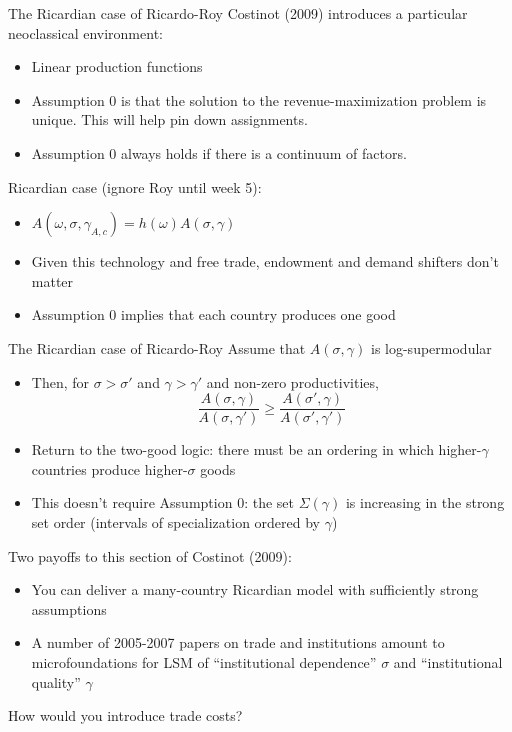 \documentclass[10pt,notes=hide]{beamer}
\begin{document}
\begin{frame}{The Ricardian case of Ricardo-Roy}
Costinot (2009) introduces a particular neoclassical environment:
\begin{itemize}
	\item Linear production functions
	\item Assumption 0 is that the solution to the revenue-maximization problem is unique.
		This will help pin down assignments.
	\item Assumption 0 always holds if there is a continuum of factors.
\end{itemize}
Ricardian case (ignore Roy until week 5):
\begin{itemize}
	\item $A(\omega,\sigma,\gamma_{A,c}) = h(\omega)A(\sigma,\gamma)$
	\item Given this technology and free trade, endowment and demand shifters don't matter
	\item Assumption 0 implies that each country produces one good
\end{itemize}
\end{frame}
\begin{frame}{The Ricardian case of Ricardo-Roy}
Assume that $A(\sigma,\gamma)$ is log-supermodular
\begin{itemize}
	\item Then, for $\sigma > \sigma'$ and $\gamma > \gamma'$ and non-zero productivities,
		\begin{equation*}\frac{A(\sigma,\gamma)}{A(\sigma,\gamma')} \geq \frac{A(\sigma',\gamma)}{A(\sigma',\gamma')}\end{equation*}
	\item Return to the two-good logic:
	there must be an ordering in which higher-$\gamma$ countries produce higher-$\sigma$ goods
	\item This doesn't require Assumption 0: the set $\Sigma(\gamma)$ is increasing in the strong set order (intervals of specialization ordered by $\gamma$)
\end{itemize}
Two payoffs to this section of Costinot (2009):
\begin{itemize}
	\item You can deliver a many-country Ricardian model with sufficiently strong assumptions
	\item A number of 2005-2007 papers on trade and institutions amount to microfoundations for LSM of ``institutional dependence'' $\sigma$ and ``institutional quality'' $\gamma$
\end{itemize}
How would you introduce trade costs?
\end{frame}
\end{document}
